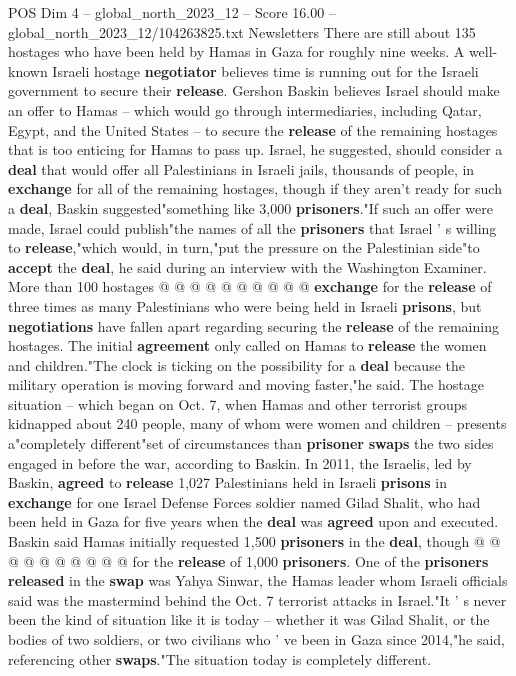 \begin{textsample}{POS Dim 4 – global\_north\_2023\_12 – Score 16.00 – global\_north\_2023\_12/104263825.txt}  \label{ex:f4_pos_319}
Newsletters There are still about 135 hostages who have been held by Hamas in Gaza for roughly nine weeks.
A well-known Israeli hostage \textbf{negotiator} believes time is running out for the Israeli government to secure their \textbf{release}.
Gershon Baskin believes Israel should make an offer to Hamas -- which would go through intermediaries, including Qatar, Egypt, and the United States -- to secure the \textbf{release} of the remaining hostages that is too enticing for Hamas to pass up.
Israel, he suggested, should consider a \textbf{deal} that would offer all Palestinians in Israeli jails, thousands of people, in \textbf{exchange} for all of the remaining hostages, though if they aren't ready for such a \textbf{deal}, Baskin suggested"something like 3,000 \textbf{prisoners}."If such an offer were made, Israel could publish"the names of all the \textbf{prisoners} that Israel ' s willing to \textbf{release},"which would, in turn,"put the pressure on the Palestinian side"to \textbf{accept} the \textbf{deal}, he said during an interview with the Washington Examiner.
More than 100 hostages @ @ @ @ @ @ @ @ @ @ \textbf{exchange} for the \textbf{release} of three times as many Palestinians who were being held in Israeli \textbf{prisons}, but \textbf{negotiations} have fallen apart regarding securing the \textbf{release} of the remaining hostages.
The initial \textbf{agreement} only called on Hamas to \textbf{release} the women and children."The clock is ticking on the possibility for a \textbf{deal} because the military operation is moving forward and moving faster,"he said.
The hostage situation -- which began on Oct. 7, when Hamas and other terrorist groups kidnapped about 240 people, many of whom were women and children -- presents a"completely different"set of circumstances than \textbf{prisoner} \textbf{swaps} the two sides engaged in before the war, according to Baskin.
In 2011, the Israelis, led by Baskin, \textbf{agreed} to \textbf{release} 1,027 Palestinians held in Israeli \textbf{prisons} in \textbf{exchange} for one Israel Defense Forces soldier named Gilad Shalit, who had been held in Gaza for five years when the \textbf{deal} was \textbf{agreed} upon and executed.
Baskin said Hamas initially requested 1,500 \textbf{prisoners} in the \textbf{deal}, though @ @ @ @ @ @ @ @ @ @ for the \textbf{release} of 1,000 \textbf{prisoners}.
One of the \textbf{prisoners} \textbf{released} in the \textbf{swap} was Yahya Sinwar, the Hamas leader whom Israeli officials said was the mastermind behind the Oct. 7 terrorist attacks in Israel."It ' s never been the kind of situation like it is today -- whether it was Gilad Shalit, or the bodies of two soldiers, or two civilians who ' ve been in Gaza since 2014,"he said, referencing other \textbf{swaps}."The situation today is completely different.

\end{textsample}
